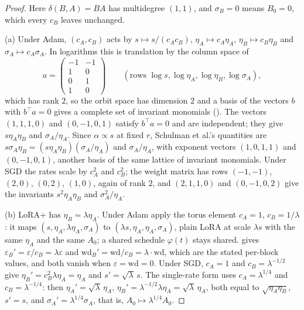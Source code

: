 \begin{proof}
Here $\delta(B,A)=BA$ has multidegree $(1,1)$, and $\sigma_B=0$ means $B_0=0$, which every $c_B$ leaves unchanged.

(a) Under Adam, $(c_A,c_B)$ acts by $s\mapsto s/(c_Ac_B)$, $\eta_A\mapsto c_A\eta_A$, $\eta_B\mapsto c_B\eta_B$ and
$\sigma_A\mapsto c_A\sigma_A$. In logarithms this is translation by the column space of
\[a=\begin{pmatrix}-1&-1\\1&0\\0&1\\1&0\end{pmatrix}\qquad(\text{rows } \log s,\log\eta_A,\log\eta_B,\log\sigma_A),\]
which has rank $2$, so the orbit space has dimension $2$ and a basis of the vectors $b$ with $b^\top a=0$ gives a complete
set of invariant monomials (). The vectors $(1,1,1,0)$ and $(0,-1,0,1)$ satisfy $b^\top a=0$ and are independent;
they give $s\eta_A\eta_B$ and $\sigma_A/\eta_A$. Since $\alpha\propto s$ at fixed $r$, Schulman et al.'s quantities are
$s\sigma_A\eta_B=(s\eta_A\eta_B)(\sigma_A/\eta_A)$ and $\sigma_A/\eta_A$, with exponent vectors $(1,0,1,1)$ and $(0,-1,0,1)$,
another basis of the same lattice of invariant monomials. Under SGD the rates scale by $c_A^2$ and $c_B^2$; the weight
matrix has rows $(-1,-1)$, $(2,0)$, $(0,2)$, $(1,0)$, again of rank $2$, and $(2,1,1,0)$ and $(0,-1,0,2)$ give the
invariants $s^2\eta_A\eta_B$ and $\sigma_A^2/\eta_A$.

(b) LoRA+ has $\eta_B=\lambda\eta_A$. Under Adam apply the torus element $c_A=1$, $c_B=1/\lambda$: it maps
$(s,\eta_A,\lambda\eta_A,\sigma_A)$ to $(\lambda s,\eta_A,\eta_A,\sigma_A)$, plain LoRA at scale $\lambda s$ with the same
$\eta_A$ and the same $A_0$; a shared schedule $\varphi(t)$ stays shared.  gives
$\varepsilon_B'=\varepsilon/c_B=\lambda\varepsilon$ and $\mathrm{wd}_B'=\mathrm{wd}/c_B=\lambda\cdot\mathrm{wd}$, which are
the stated per-block values, and both vanish when $\varepsilon=\mathrm{wd}=0$. Under SGD, $c_A=1$ and $c_B=\lambda^{-1/2}$
give $\eta_B'=c_B^2\lambda\eta_A=\eta_A$ and $s'=\sqrt\lambda\,s$. The single-rate form uses $c_A=\lambda^{1/4}$ and
$c_B=\lambda^{-1/4}$: then $\eta_A'=\sqrt\lambda\,\eta_A$, $\eta_B'=\lambda^{-1/2}\lambda\eta_A=\sqrt\lambda\,\eta_A$, both
equal to $\sqrt{\eta_A\eta_B}$, $s'=s$, and $\sigma_A'=\lambda^{1/4}\sigma_A$, that is, $A_0\mapsto\lambda^{1/4}A_0$.


\end{proof}
